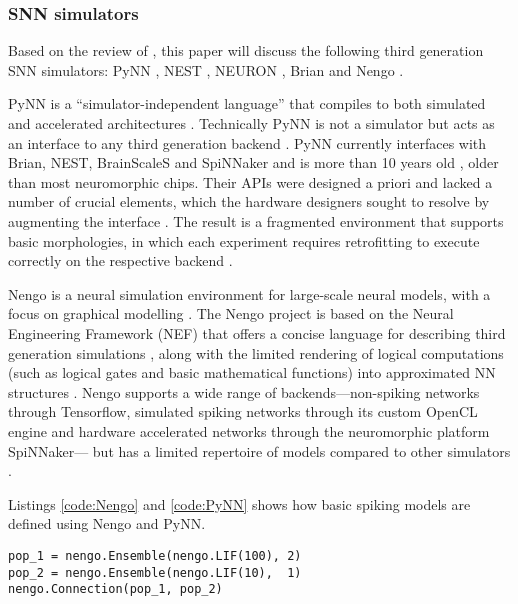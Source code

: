\documentclass[report.tex]{subfiles}
\begin{document}
\subsubsection{\Gls{SNN} simulators} \label{sec:SNN-simulators}
Based on the review of \textcite{Blundell2018}, this paper will discuss
the following third generation \gls{SNN} simulators: PyNN \cite{Davison2009},
NEST \cite{Gewaltig2007}, NEURON \cite{Carnevale2007},
Brian \cite{Goodman2013} and Nengo \cite{Eliasmith2015}.

PyNN is a ``simulator-independent language''
\cite{PyNN2018} that compiles to both simulated and
accelerated architectures \cite{Davison2009}.
Technically PyNN is not a simulator but acts as an interface to any third generation
backend \cite{Davison2009}.
PyNN currently interfaces with Brian, NEST, BrainScaleS and SpiNNaker
and is more than 10 years old \cite{Davison2009}, older
than most neuromorphic chips. 
Their \gls{API}s were designed a priori and lacked a number of crucial
elements, which the hardware designers sought
to resolve by augmenting the interface \cite{Pfeil2013, PyNN2018}.
The result is a fragmented environment that supports basic morphologies, 
in which each experiment requires retrofitting to execute correctly on the respective backend \cite{PyNN2018}.

Nengo is a neural simulation environment for large-scale neural models, with
a focus on graphical modelling \cite{Eliasmith2015}. 
The Nengo project is based on the Neural Engineering Framework (NEF)
 that offers a concise language for
describing third generation simulations \cite{Bekolay2014}, along with
the limited rendering of logical computations (such as logical gates and basic
mathematical functions) into approximated
\gls{NN} structures \cite{Eliasmith2004, Eliasmith2015}.
Nengo supports a wide range of backends---non-spiking networks through Tensorflow,
simulated spiking networks through its custom \gls{OpenCL} engine and 
hardware accelerated networks through the neuromorphic platform SpiNNaker---
but has a limited repertoire of models compared to other simulators
\cite{Nengo2018}.

Listings \ref{code:Nengo} and \ref{code:PyNN} shows how
basic spiking models are defined using Nengo and PyNN.

\begin{minipage}{\linewidth}
\begin{lstlisting}
pop_1 = nengo.Ensemble(nengo.LIF(100), 2)
pop_2 = nengo.Ensemble(nengo.LIF(10),  1)
nengo.Connection(pop_1, pop_2)
\end{lstlisting}
\end{minipage}
\end{document}
